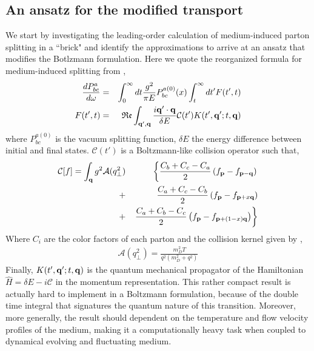 \documentclass[aps, prc, reprint, amsmath, groupedaddress, nofootinbib]{revtex4-1}
\begin{document}
\subsection{An ansatz for the modified transport}
We start by investigating the leading-order calculation of medium-induced parton splitting in a ``brick" and identify the approximations to arrive at an ansatz that modifies the Botlzmann formulation.
Here we quote the reorganized formula for medium-induced splitting from \cite{CaronHuot:2010bp},
\begin{eqnarray}
\frac{dP^{a}_{bc}}{d\omega} &=& \int_0^\infty dt \frac{g^2}{\pi E} P_{bc}^{a(0)}(x) \int_t^\infty dt'  F(t', t)
\label{eq:full-theory}
\\
F(t', t) &=& \mathfrak{Re} \int_{{\bf q}', {\bf q}} \frac{i {\bf q}'\cdot {\bf q}}{\delta E} \mathcal{C}(t') K(t', {\bf q}'; t, {\bf q})
\end{eqnarray}
where $P_{bc}^{a(0)}$ is the vacuum splitting function, $\delta E$ the energy difference between initial and final states. 
$\mathcal{C}(t')$ is a Boltzmann-like collision operator such that,
\begin{eqnarray}
\mathcal{C}[f] = \int_{\bf q} g^2\mathcal{A}(q_\perp^2)
&&\left\{  \frac{C_b+C_c-C_a}{2}\left(f_{\bf p}-f_{{\bf p}-{\bf q}}\right) \right.\\\nonumber
 +&&    \frac{C_a+C_c-C_b}{2}\left(f_{\bf p}-f_{{\bf p}+x{\bf q}}\right) \\\nonumber
+&&  \left. \frac{C_a+C_b-C_c}{2}\left(f_{\bf p}-f_{{\bf p}+(1-x){\bf q}}\right)\right\}
\end{eqnarray}
Where $C_i$ are the color factors of each parton and the collision kernel given by \cite{Aurenche:2002pd},
\begin{eqnarray}
\mathcal{A}(q_\perp^2) = \frac{m_D^2 T}{q^2\left(m_D^2+q^2\right)}
\end{eqnarray}
Finally, $K(t', {\bf q}'; t, {\bf q})$ is the quantum mechanical propagator of the Hamiltonian $\hat{H} = \delta E - i\mathcal{C}$ in the momentum representation.
This rather compact result is actually hard to implement in a Boltzmann formulation, because of the double time integral that signatures the quantum nature of this transition.
Moreover, more generally, the result should dependent on the temperature and flow velocity profiles of the medium, making it a computationally heavy task when coupled to dynamical evolving and fluctuating medium.
\end{document}
